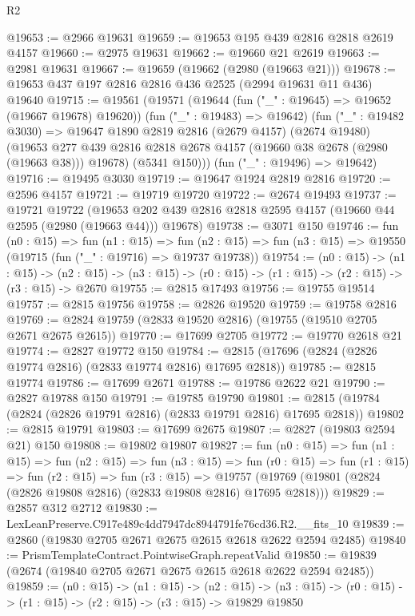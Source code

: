 \begin{lexlean}{R2}
\begin{coremodule}
@19653 := @2966 @19631
@19659 := @19653 @195 @439 @2816 @2818 @2619 @4157
@19660 := @2975 @19631
@19662 := @19660 @21 @2619
@19663 := @2981 @19631
@19667 := @19659 (@19662 (@2980 (@19663 @21)))
@19678 := @19653 @437 @197 @2816 @2816 @436 @2525 (@2994 @19631 @11 @436) @19640
@19715 := @19561
    (@19571
      (@19644 (fun ("_" : @19645) => @19652 (@19667 @19678) @19620))
      (fun ("_" : @19483) => @19642)
      (fun ("_" : @19482 @3030) =>
      @19647
        @1890
        @2819
        @2816
        (@2679 @4157)
        (@2674 @19480)
        (@19653 @277 @439 @2816 @2818 @2678 @4157 (@19660 @38 @2678 (@2980 (@19663 @38))) @19678)
        (@5341 @150)))
    (fun ("_" : @19496) => @19642)
@19716 := @19495 @3030
@19719 := @19647 @1924 @2819 @2816
@19720 := @2596 @4157
@19721 := @19719 @19720
@19722 := @2674 @19493
@19737 := @19721
    @19722
    (@19653 @202 @439 @2816 @2818 @2595 @4157 (@19660 @44 @2595 (@2980 (@19663 @44))) @19678)
@19738 := @3071 @150
@19746 := fun (n0 : @15) =>
  fun (n1 : @15) =>
  fun (n2 : @15) => fun (n3 : @15) => @19550 (@19715 (fun ("_" : @19716) => @19737 @19738))
@19754 := (n0 : @15) ->
  (n1 : @15) ->
  (n2 : @15) -> (n3 : @15) -> (r0 : @15) -> (r1 : @15) -> (r2 : @15) -> (r3 : @15) -> @2670
@19755 := @2815 @17493
@19756 := @19755 @19514
@19757 := @2815 @19756
@19758 := @2826 @19520
@19759 := @19758 @2816
@19769 := @2824 @19759 (@2833 @19520 @2816) (@19755 (@19510 @2705 @2671 @2675 @2615))
@19770 := @17699 @2705
@19772 := @19770 @2618 @21
@19774 := @2827 @19772 @150
@19784 := @2815 (@17696 (@2824 (@2826 @19774 @2816) (@2833 @19774 @2816) @17695 @2818))
@19785 := @2815 @19774
@19786 := @17699 @2671
@19788 := @19786 @2622 @21
@19790 := @2827 @19788 @150
@19791 := @19785 @19790
@19801 := @2815 (@19784 (@2824 (@2826 @19791 @2816) (@2833 @19791 @2816) @17695 @2818))
@19802 := @2815 @19791
@19803 := @17699 @2675
@19807 := @2827 (@19803 @2594 @21) @150
@19808 := @19802 @19807
@19827 := fun (n0 : @15) =>
  fun (n1 : @15) =>
  fun (n2 : @15) =>
  fun (n3 : @15) =>
  fun (r0 : @15) =>
  fun (r1 : @15) =>
  fun (r2 : @15) =>
  fun (r3 : @15) =>
  @19757 (@19769 (@19801 (@2824 (@2826 @19808 @2816) (@2833 @19808 @2816) @17695 @2818)))
@19829 := @2857 @312 @2712
@19830 := LexLeanPreserve.C917e489c4dd7947dc8944791fe76cd36.R2.__fits_10
@19839 := @2860 (@19830 @2705 @2671 @2675 @2615 @2618 @2622 @2594 @2485)
@19840 := PrismTemplateContract.PointwiseGraph.repeatValid
@19850 := @19839 (@2674 (@19840 @2705 @2671 @2675 @2615 @2618 @2622 @2594 @2485))
@19859 := (n0 : @15) ->
  (n1 : @15) ->
  (n2 : @15) -> (n3 : @15) -> (r0 : @15) -> (r1 : @15) -> (r2 : @15) -> (r3 : @15) -> @19829 @19850

\end{coremodule}
\end{lexlean}
